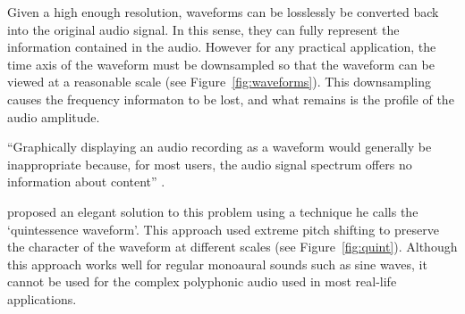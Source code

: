 Given a high enough resolution, waveforms can be losslessly be converted back into the original audio signal. In this
sense, they can fully represent the information contained in the audio. However for any practical application, the
time axis of the waveform must be downsampled so that the waveform can be viewed at a reasonable scale (see
Figure~\ref{fig:waveforms}).  This downsampling causes the frequency informaton to be lost, and what remains is the
profile of the audio amplitude.

``Graphically displaying an audio recording as a waveform would generally be inappropriate because, for most users, the
audio signal spectrum offers no information about content'' \citep{Bouamrane2007}.

\citet{Loviscach2011}
proposed an elegant solution to this problem using a technique he calls the `quintessence waveform'. This approach
used extreme pitch shifting to preserve the character of the waveform at different scales (see Figure~\ref{fig:quint}).
Although this approach works well for regular monoaural sounds such as sine waves, it cannot be used for the complex
polyphonic audio used in most real-life applications.

